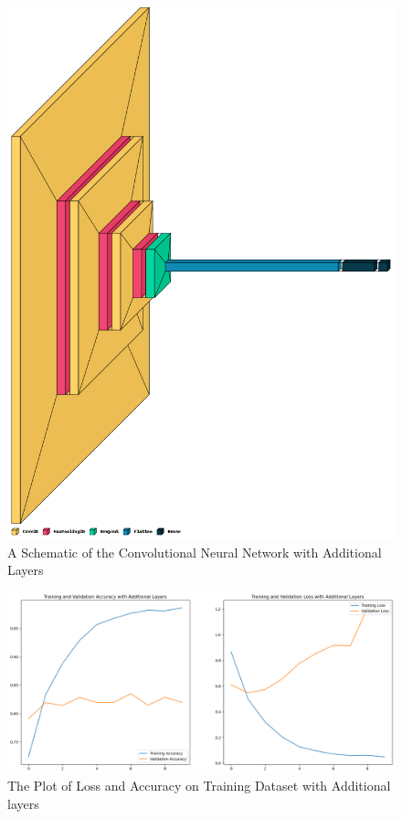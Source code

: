 \documentclass[11pt,a4paper]{article}
\begin{document}
  \begin{figure}[h!]
 \centering
  \includegraphics[width=0.85\linewidth]{refined_schema.png}
  \caption{A Schematic of the Convolutional Neural Network with Additional Layers}
  \label{refined_schema}
\end{figure}
 
 \begin{figure}[h!]
 \centering
  \includegraphics[width=\linewidth]{refined_training_plot.png}
  \caption{The Plot of Loss and Accuracy on Training Dataset with Additional layers}
  \label{refined_model_training}
\end{figure}
\FloatBarrier
\end{document}
